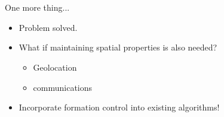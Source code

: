 \documentclass[t]{beamer}
\begin{document}

\section[Formation Control and PLA]{}
\begin{frame}[label=onemorething]{One more thing...}
\begin{itemize}
\item<1-> Problem solved.
\item<2-> What if maintaining spatial properties is also needed? \begin{itemize}
	\item<2-> Geolocation
	\item<2-> communications
\end{itemize}
\item<3-> Incorporate formation control into existing algorithms!
\end{itemize}
\end{frame}

\end{document}
